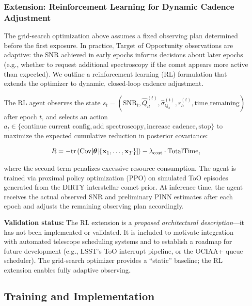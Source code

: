 \documentclass[preprint2]{aastex631}
\begin{document}
\subsubsection{Extension: Reinforcement Learning for Dynamic Cadence Adjustment}

The grid-search optimization above assumes a fixed observing plan determined before the first exposure. In practice, Target of Opportunity observations are adaptive: the SNR achieved in early epochs informs decisions about later epochs (e.g., whether to request additional spectroscopy if the comet appears more active than expected). We outline a reinforcement learning (RL) formulation that extends the optimizer to dynamic, closed-loop cadence adjustment.

The RL agent observes the state $s_t = (\text{SNR}_t, \hat{Q}_d^{(t)}, \hat{\sigma}_{Q_d}^{(t)}, r_h^{(t)}, \text{time\_remaining})$ after epoch $t$, and selects an action $a_t \in \{\text{continue current config}, \text{add spectroscopy}, \text{increase cadence}, \text{stop}\}$ to maximize the expected cumulative reduction in posterior covariance:

\begin{equation}\label{eq:rl_reward}
R = -\text{tr}\left(\text{Cov}[\boldsymbol{\theta} | \{\mathbf{x}_1, \ldots, \mathbf{x}_T\}]\right) - \lambda_{\rm cost} \cdot \text{TotalTime},
\end{equation}

where the second term penalizes excessive resource consumption. The agent is trained via proximal policy optimization (PPO) on simulated ToO episodes generated from the DIRTY interstellar comet prior. At inference time, the agent receives the actual observed SNR and preliminary PINN estimates after each epoch and adjusts the remaining observing plan accordingly.

\textbf{Validation status:} The RL extension is a \textit{proposed architectural description}---it has not been implemented or validated. It is included to motivate integration with automated telescope scheduling systems and to establish a roadmap for future development (e.g., LSST's ToO interrupt pipeline, or the OCIAA+ queue scheduler). The grid-search optimizer provides a ``static'' baseline; the RL extension enables fully adaptive observing.

\subsection{Training and Implementation}
\end{document}

